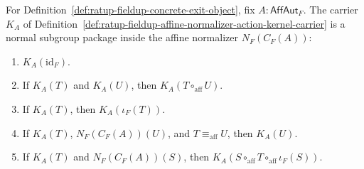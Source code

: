 \begin{theorem}
\label{thm:ratup-fieldup-affine-normalizer-action-kernel-normal-subgroup}
For Definition~\ref{def:ratup-fieldup-concrete-exit-object}, fix
$A:\mathsf{AffAut}_F$. The carrier $K_A$ of
Definition~\ref{def:ratup-fieldup-affine-normalizer-action-kernel-carrier} is a
normal subgroup package inside the affine normalizer $N_F(C_F(A))$:
\begin{enumerate}
\item $K_A(\mathrm{id}_F)$.
\item If $K_A(T)$ and $K_A(U)$, then $K_A(T\circ_{\mathrm{aff}}U)$.
\item If $K_A(T)$, then $K_A(\iota_F(T))$.
\item If $K_A(T)$, $N_F(C_F(A))(U)$, and $T\equiv_{\mathrm{aff}}U$, then
$K_A(U)$.
\item If $K_A(T)$ and $N_F(C_F(A))(S)$, then
$K_A(S\circ_{\mathrm{aff}}T\circ_{\mathrm{aff}}\iota_F(S))$.
\end{enumerate}
\end{theorem}
